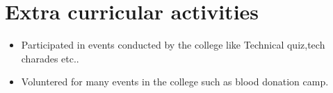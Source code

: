 \documentclass[11pt,oneside,a4paper]{article}
\begin{document}
\section{Extra curricular activities}
\begin{itemize}
\item Participated in events conducted by the college like Technical quiz,tech charades etc..
\item Voluntered for many events in the college such as blood donation camp. 
\end{itemize}	

	
\end{document}
